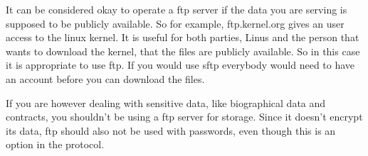 It can be considered okay to operate a ftp server if the data you are serving is supposed to be publicly available. So for example, ftp.kernel.org gives an user access to the linux kernel. It is useful for both parties, Linus and the person that wants to download the kernel, that the files are publicly available. So in this case it is appropriate to use ftp. If you would use sftp everybody would need to have an account before you can download the files.

If you are however dealing with sensitive data, like biographical data and contracts, you shouldn't be using a ftp server for storage. Since it doesn't encrypt its data, ftp should also not be used with passwords, even though this is an option in the protocol. 